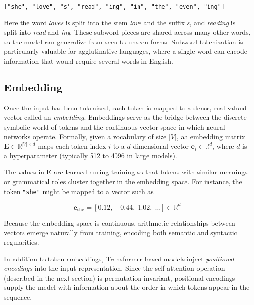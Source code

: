 \begin{center}
\texttt{["she", "love", "s", "read", "ing", "in", "the", "even", "ing"]}
\end{center}

\noindent Here the word \textit{loves} is split into the stem \textit{love} and the suffix \textit{s}, and \textit{reading} is split into \textit{read} and \textit{ing}. These subword pieces are shared across many other words, so the model can generalize from seen to unseen forms. Subword tokenization is particularly valuable for agglutinative languages, where a single word can encode information that would require several words in English.

\subsection{Embedding}

Once the input has been tokenized, each token is mapped to a dense, real-valued vector called an \emph{embedding}. Embeddings serve as the bridge between the discrete symbolic world of tokens and the continuous vector space in which neural networks operate. Formally, given a vocabulary of size $|V|$, an embedding matrix $\mathbf{E} \in \mathbb{R}^{|V| \times d}$ maps each token index $i$ to a $d$-dimensional vector $\mathbf{e}_i \in \mathbb{R}^d$, where $d$ is a hyperparameter (typically 512 to 4096 in large models).

The values in $\mathbf{E}$ are learned during training so that tokens with similar meanings or grammatical roles cluster together in the embedding space. For instance, the token \texttt{"she"} might be mapped to a vector such as

\begin{equation}
  \mathbf{e}_{\text{she}} = [0.12,\; {-0.44},\; 1.02,\; \ldots] \in \mathbb{R}^{d}
\end{equation}

\noindent Because the embedding space is continuous, arithmetic relationships between vectors emerge naturally from training, encoding both semantic and syntactic regularities.

In addition to token embeddings, Transformer-based models inject \emph{positional encodings} into the input representation. Since the self-attention operation (described in the next section) is permutation-invariant, positional encodings supply the model with information about the order in which tokens appear in the sequence.

